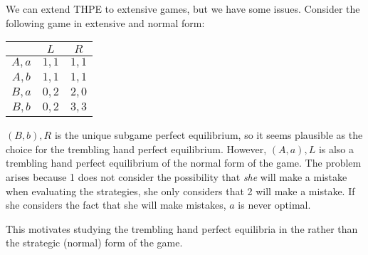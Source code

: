\documentclass[10pt]{article}
\begin{document}
\begin{remark}
	We can extend THPE to extensive games, but we have some issues. Consider the following game in extensive and normal form:
	\begin{figure}[H]
	\centering
	\end{figure}
	\begin{center}
		\begin{tabular}{c|cc}
			& $L$ & $R$ \\\hline 
			$A,a$ & $1,1$ & $1,1$ \\
			$A,b$ & $1,1$ & $1,1$ \\
			$B,a$ & $0,2$ & $2,0$ \\
			$B,b$ & $0,2$ & $3,3$ 
		\end{tabular}
	\end{center}
	$(B,b),R$ is the unique subgame perfect equilibrium, so it seems plausible as the choice for the trembling hand perfect equilibrium. However, $(A,a),L$ is also a trembling hand perfect equilibrium of the normal form of the game. The problem arises because 1 does not consider the possibility that \emph{she} will make a mistake when evaluating the strategies, she only considers that 2 will make a mistake. If she considers the fact that she will make mistakes, $a$ is never optimal. 
	
	This motivates studying the trembling hand perfect equilibria in the  rather than the strategic (normal) form of the game. 
\end{remark}
\end{document}
